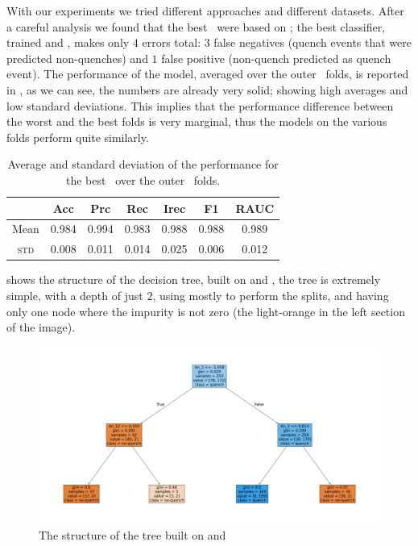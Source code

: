 With our experiments we tried different approaches and different datasets. After a careful analysis
we found that the best \dts\ were based on \an; the best classifier, trained \an[2] and \an[12],
makes only $4$ errors total: $3$ false negatives (quench events that were predicted non-quenches)
and $1$ false positive (non-quench predicted as quench event). The performance of the model,
averaged over the outer \cv\ folds, is reported in , as we can see, the
numbers are already very solid; showing high averages and low standard deviations. This implies that
the performance difference between the worst and the best folds is very marginal, thus the models on
the various folds perform quite similarly.
\begin{table}[!ht]
	\caption{Average and standard deviation of the performance for the best \dt\ over the outer \cv\
		folds.}\label{tbl:an-2-12-perf}

	\bigskip
	\setlength{\tabcolsep}{6pt}
	\centering
	\begin{tabular}{ccccccc}
		\toprule
		\textbf{}    & \textbf{Acc} & \textbf{Prc} & \textbf{Rec} & \textbf{Irec} & \textbf{F1} & \textbf{RAUC} \\
		\midrule
		Mean         & 0.984        & 0.994        & 0.983        & 0.988         & 0.988
		             & 0.989                                                                                    \\
		\textsc{std} & 0.008        & 0.011        & 0.014        & 0.025         & 0.006
		             & 0.012                                                                                    \\
		\bottomrule
	\end{tabular}
\end{table}

 shows the structure of the decision tree, built on \an[2] and \an[12], the
tree is extremely simple, with a depth of just $2$, using mostly \an[2] to perform the splits, and
having only one node where the impurity is not zero (the light-orange in the left section of the
image).
\begin{figure}[!ht]
	\centering
	\includegraphics[width=0.7\linewidth]{img/An_2_12_pt_dt.png}
	\caption{The structure of the tree built on \an[2] and \an[12]} \label{fig:dt-an-2-12-pt}
\end{figure}

